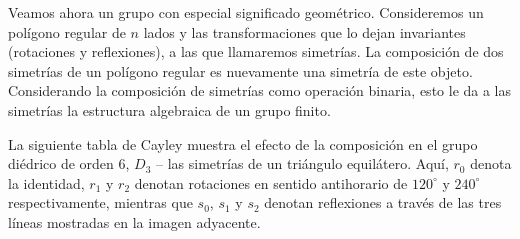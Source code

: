 
Veamos ahora un grupo con especial significado geométrico. Consideremos un polígono regular de \(n\) lados y las transformaciones que lo dejan invariantes (rotaciones y reflexiones), a las que llamaremos simetrías. La composición de dos simetrías de un polígono regular es nuevamente una simetría de este objeto. Considerando la composición de simetrías como operación binaria, esto le da a las simetrías la estructura algebraica de un grupo finito.

La siguiente tabla de Cayley muestra el efecto de la composición en el grupo diédrico de orden 6, \(D_3\) -- las simetrías de un triángulo equilátero. Aquí, \(r_0\) denota la identidad, \(r_1\) y \(r_2\) denotan rotaciones en sentido antihorario de \(120^\circ\) y \(240^\circ\) respectivamente, mientras que \(s_0\), \(s_1\) y \(s_2\) denotan reflexiones a través de las tres líneas mostradas en la imagen adyacente.

